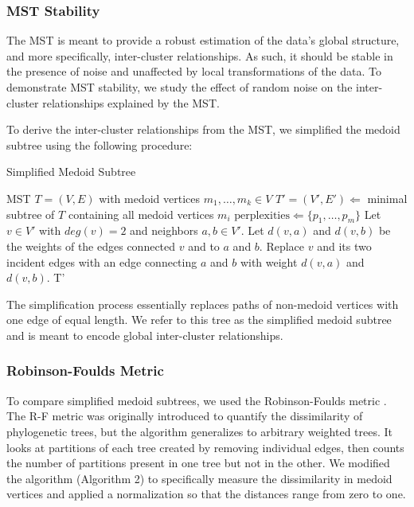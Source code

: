 \documentclass{article}
\begin{document}
\subsubsection{MST Stability}
The MST is meant to provide a robust estimation of the data's global structure, and more specifically, inter-cluster relationships. As such, it should be stable in the presence of noise and unaffected by local transformations of the data. To demonstrate MST stability, we study the effect of random noise on the inter-cluster relationships explained by the MST.

To derive the inter-cluster relationships from the MST, we simplified the medoid subtree using the following procedure:

\begin{algorithm}[H]
\caption{Simplified Medoid Subtree}\label{algo1}
\begin{algorithmic}[1]
\Require MST $T = (V, E)$ with medoid vertices $m_1, \hdots, m_k \in V$
\State $T' = (V', E') \Leftarrow$ minimal subtree of $T$ containing all medoid vertices $m_i$
\State $\textrm{perplexities} \Leftarrow \{p_1, \hdots, p_m\}$
\Repeat
	\State Let $v \in V'$ with $deg(v) = 2$ and neighbors $a, b \in V'$. Let $d(v, a)$ and $d(v, b)$ be the weights of the edges connected $v$ and to $a$ and $b$.
	\State Replace $v$ and its two incident edges with an edge connecting $a$ and $b$ with weight $d(v, a)$ and $d(v, b)$.
\State \Output T'
\end{algorithmic}
\end{algorithm}

The simplification process essentially replaces paths of non-medoid vertices with one edge of equal length. We refer to this tree as the simplified medoid subtree and is meant to encode global inter-cluster relationships.

\subsubsection{Robinson-Foulds Metric}
To compare simplified medoid subtrees, we used the Robinson-Foulds metric \cite{RF metric}. The R-F metric was originally introduced to quantify the dissimilarity of phylogenetic trees, but the algorithm generalizes to arbitrary weighted trees. It looks at partitions of each tree created by removing individual edges, then counts the number of partitions present in one tree but not in the other. We modified the algorithm (Algorithm 2) to specifically measure the dissimilarity in medoid vertices and applied a normalization so that the distances range from zero to one.
\end{document}
